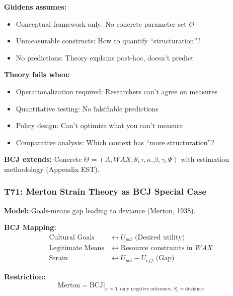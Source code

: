\begin{tcolorbox}[colback=red!5!white, colframe=red!75!black,
    title=Boundary Condition: Where Giddens Fails]
\textbf{Giddens assumes:}
\begin{itemize}[nosep]
\item Conceptual framework only: No concrete parameter set $\Theta$
\item Unmeasurable constructs: How to quantify ``structuration''?
\item No predictions: Theory explains post-hoc, doesn't predict
\end{itemize}

\textbf{Theory fails when:}
\begin{itemize}[nosep]
\item Operationalization required: Researchers can't agree on measures
\item Quantitative testing: No falsifiable predictions
\item Policy design: Can't optimize what you can't measure
\item Comparative analysis: Which context has ``more structuration''?
\end{itemize}

\textbf{BCJ extends:} Concrete $\Theta = (A, WAX, \theta, \tau, \kappa, \beta, \gamma, \Psi)$ with estimation methodology (Appendix EST).
\end{tcolorbox}

\subsubsection*{T71: Merton Strain Theory as BCJ Special Case}

\textbf{Model:} Goals-means gap leading to deviance (Merton, 1938).

\textbf{BCJ Mapping:}
\begin{align}
\text{Cultural Goals} &\leftrightarrow U_{pot} \text{ (Desired utility)} \\
\text{Legitimate Means} &\leftrightarrow \text{Resource constraints in } WAX \\
\text{Strain} &\leftrightarrow U_{pot} - U_{eff} \text{ (Gap)}
\end{align}

\textbf{Restriction:}
\begin{equation}
\text{Merton} = \text{BCJ} \big|_{\kappa = 0, \, \text{only negative outcomes}, \, S_6 = \text{deviance}}
\end{equation}

